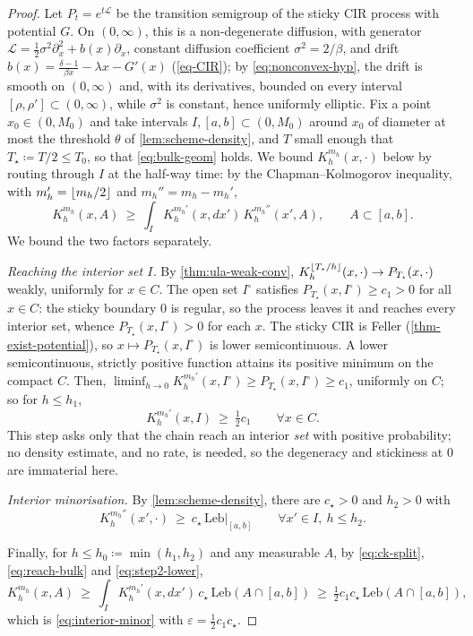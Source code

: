 \documentclass[aap,preprint]{imsart}
\DeclarePairedDelimiter{\floor}{\lfloor}{\rfloor} %
\numberwithin{equation}{section}
\theoremstyle{plain}
\theoremstyle{definition}
\begin{document}
\begin{proof}
  Let $P_t=e^{t\mathcal L}$ be the transition semigroup of the sticky CIR process with potential
  $G$. On $(0,\infty)$, this is a non-degenerate diffusion, with generator
  $\mathcal L=\tfrac12\sigma^2\partial_x^2+b(x)\partial_x$, constant diffusion coefficient
  $\sigma^2=2/\beta$, and drift $b(x)=\tfrac{\delta-1}{\beta x}-\lambda x-G'(x)$ (\cref{eq-CIR}); by
  \eqref{eq:nonconvex-hyp}, the drift is smooth on $(0,\infty)$ and, with its derivatives, bounded on
  every interval $[\rho,\rho']\subset(0,\infty)$, while $\sigma^2$ is constant, hence uniformly
  elliptic. Fix a point $x_0\in(0,M_0)$ and
  take intervals $I,[a,b]\subset(0,M_0)$ around $x_0$ of diameter at most the threshold $\theta$ of
  \cref{lem:scheme-density}, and $T$ small enough that $T_\star\coloneqq T/2\le T_0$, so that
  \eqref{eq:bulk-geom} holds. We bound $K_h^{m_h}(x,\cdot)$ below
  by routing through $I$ at the half-way time: by the Chapman--Kolmogorov inequality, with
  $m_h'=\floor*{m_h/2}$ and $m_h''=m_h-m_h'$,
  \begin{equation}\label{eq:ck-split}
    K_h^{m_h}(x,A)\ \ge\ \int_I K_h^{m_h'}(x,dx')\,K_h^{m_h''}(x',A),\qquad A\subset[a,b].
  \end{equation}
  We bound the two factors separately.

  \emph{Reaching the interior set $I$.} By \cref{thm:ula-weak-conv},
  $K_h^{\floor*{T_\star/h}}(x,\cdot)\to P_{T_\star}(x,\cdot)$ weakly, uniformly for $x\in C$. The open set $I^\circ$ satisfies $P_{T_\star}(x,I^\circ)\ge c_1>0$ for
  all $x\in C$: the sticky boundary $0$ is regular, so the process leaves it and reaches every
  interior set, whence $P_{T_\star}(x,I^\circ)>0$ for each $x$. The sticky CIR is Feller (\cref{thm-exist-potential}), so $x\mapsto P_{T_\star}(x,I^\circ)$ is lower
  semicontinuous. A lower semicontinuous, strictly positive function
  attains its positive minimum on the compact $C$. Then, $\liminf_{h\to0}K_h^{m_h'}(x,I^\circ)
  \ge P_{T_\star}(x,I^\circ)\ge c_1$, uniformly on $C$; so for $h\le h_1$,
  \begin{equation}\label{eq:reach-bulk}
    K_h^{m_h'}(x,I)\ \ge\ \tfrac12 c_1\qquad \forall x\in C.
  \end{equation}
  This step asks only that the chain reach an interior \emph{set} with positive probability; no
  density estimate, and no rate, is needed, so the degeneracy and stickiness at $0$ are
  immaterial here.

  \emph{Interior minorisation.} By \cref{lem:scheme-density}, there are $c_\star>0$ and $h_2>0$ with
  \begin{equation}\label{eq:step2-lower}
    K_h^{m_h''}(x',\cdot)\ \ge\ c_\star\,\mathrm{Leb}|_{[a,b]}\qquad \forall x'\in I,\ h\le h_2.
  \end{equation}

  Finally, for $h\le h_0\coloneqq \min(h_1,h_2)$ and any measurable $A$, by \eqref{eq:ck-split},
  \eqref{eq:reach-bulk} and \eqref{eq:step2-lower},
  \[
    K_h^{m_h}(x,A)\ \ge\ \int_I K_h^{m_h'}(x,dx')\,c_\star\,\mathrm{Leb}(A\cap[a,b])
    \ \ge\ \tfrac12 c_1 c_\star\,\mathrm{Leb}(A\cap[a,b]),
  \]
  which is \eqref{eq:interior-minor} with $\varepsilon=\tfrac12 c_1 c_\star$.
\end{proof}
\end{document}
